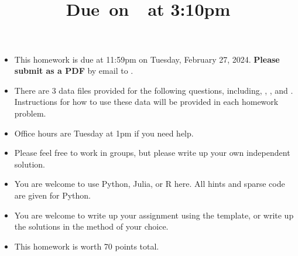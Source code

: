 \documentclass{article}
\title{
    \vspace{2in}
    \textmd{\textbf{\hmwkClass\hmwkTitle}}\\
    \normalsize\vspace{0.1in}\small{Due\ on\ \hmwkDueDate\ at 3:10pm}\\
    \vspace{3in}
}
\author{\hmwkAuthorName}
\date{}
\begin{document}

\begin{itemize}
\item This homework is due at 11:59pm on Tuesday, February 27, 2024. {\bf Please submit as a PDF} by email to . 
\item There are 3 data files provided for the following questions, including, , , and . Instructions for how to use these data will be provided in each homework problem. 
\item Office hours are Tuesday at 1pm if you need help. 
\item Please feel free to work in groups, but please write up your own independent solution. 
\item You are welcome to use Python, Julia, or R here. All hints and sparse code are given for Python.
\item You are welcome to write up your assignment using the  template, or write up the solutions in the method of your choice. 
\item This homework is worth 70 points total. 
\end{itemize}
\end{document}

